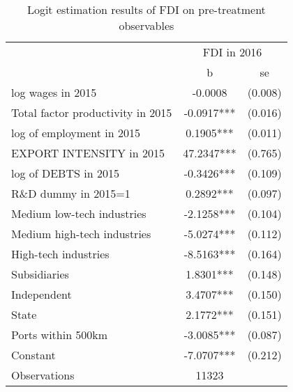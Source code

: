 \begin{table}[htbp]\centering
\def\sym#1{\ifmmode^{#1}\else\(^{#1}\)\fi}
\caption{Logit estimation results of FDI on pre-treatment observables }
\label{selection_logit}
\begin{tabular}{l*{1}{cc}}
\hline\hline
                &\multicolumn{2}{c}{FDI in 2016}\\
                &        b   &       se\\
\hline
log wages in 2015&  -0.0008   &  (0.008)\\
Total factor productivity in 2015&  -0.0917***&  (0.016)\\
log of employment in 2015&   0.1905***&  (0.011)\\
EXPORT INTENSITY in 2015&  47.2347***&  (0.765)\\
 log of DEBTS in 2015&  -0.3426***&  (0.109)\\
R\&D dummy in 2015=1&   0.2892***&  (0.097)\\
Medium low-tech industries&  -2.1258***&  (0.104)\\
Medium high-tech industries&  -5.0274***&  (0.112)\\
High-tech industries&  -8.5163***&  (0.164)\\
 Subsidiaries   &   1.8301***&  (0.148)\\
 Independent    &   3.4707***&  (0.150)\\
 State          &   2.1772***&  (0.151)\\
Ports within 500km&  -3.0085***&  (0.087)\\
Constant        &  -7.0707***&  (0.212)\\
\hline
Observations    &    11323   &         \\
\hline\hline
\end{tabular}
\end{table}
